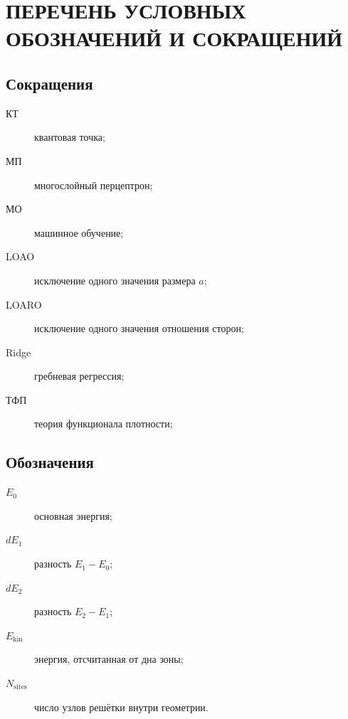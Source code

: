 \chapter*{ПЕРЕЧЕНЬ УСЛОВНЫХ ОБОЗНАЧЕНИЙ И СОКРАЩЕНИЙ}

\section*{Сокращения}

\begin{description}
  \item[КТ] квантовая точка;
  \item[МП] многослойный перцептрон;
  \item[МО] машинное обучение;
  \item[LOAO] исключение одного значения размера $a$;
  \item[LOARO] исключение одного значения отношения сторон;
  \item[Ridge] гребневая регрессия;
  \item[ТФП] теория функционала плотности;
\end{description}

\section*{Обозначения}

\begin{description}
  \item[$E_0$] основная энергия;
  \item[$dE_1$] разность $E_1 - E_0$;
  \item[$dE_2$] разность $E_2 - E_1$;
  \item[$E_{\mathrm{kin}}$] энергия, отсчитанная от дна зоны;
  \item[$N_{\mathrm{sites}}$] число узлов решётки внутри геометрии.
\end{description}

\clearpage
